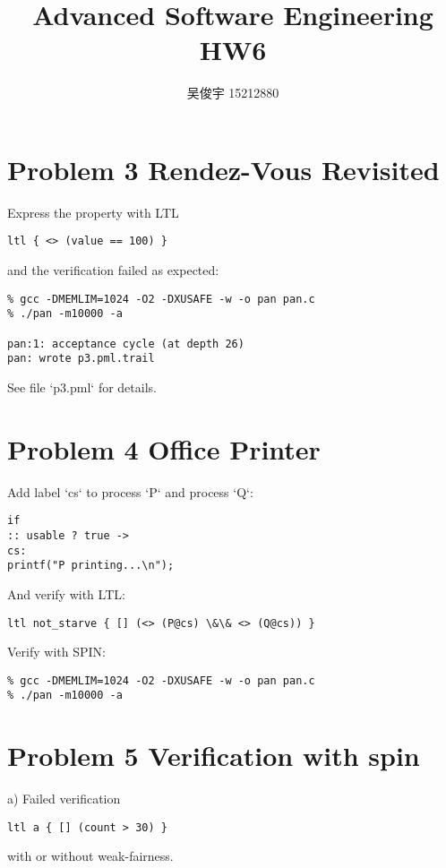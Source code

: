 \documentclass{ctexart}
\title{Advanced Software Engineering HW6}
\author{吴俊宇 15212880}
\begin{document}
\maketitle

\section*{Problem 3 Rendez-Vous Revisited}

Express the property with LTL
\begin{lstlisting}[frame=single]
ltl { <> (value == 100) }
\end{lstlisting}

and the verification failed as expected:
\begin{lstlisting}[frame=single]
% spin -a $<
% gcc -DMEMLIM=1024 -O2 -DXUSAFE -w -o pan pan.c
% ./pan -m10000 -a

pan:1: acceptance cycle (at depth 26)
pan: wrote p3.pml.trail
\end{lstlisting}

See file `p3.pml` for details.

\section*{Problem 4 Office Printer}

Add label `cs` to process `P` and process `Q`:
\begin{lstlisting}[frame=single]
if
:: usable ? true ->
cs:
printf("P printing...\n");
\end{lstlisting}

And verify with LTL:
\begin{lstlisting}[frame=single]
ltl not_starve { [] (<> (P@cs) \&\& <> (Q@cs)) }
\end{lstlisting}

Verify with SPIN:
\begin{lstlisting}[frame=single]
% spin -a $<
% gcc -DMEMLIM=1024 -O2 -DXUSAFE -w -o pan pan.c
% ./pan -m10000 -a
\end{lstlisting}

\section*{Problem 5 Verification with spin}

a) Failed verification
\begin{lstlisting}[frame=single]
ltl a { [] (count > 30) }
\end{lstlisting}
with or without weak-fairness.
\end{document}
